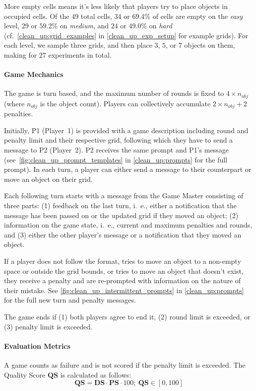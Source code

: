 More empty cells means it's less likely that players try to place objects in occupied cells. Of the 49 total cells, $34$ or $69.4\%$ of cells are empty on the \textit{easy} level, $29$ or $59.2\%$ on \textit{medium}, and $24$ or $49.0\%$ on \textit{hard} (cf.~\cref{clean_up:grid_examples} in \cref{clean_up_exp_setup} for example grids). For each level, we sample three grids, and then place $3$, $5$, or $7$ objects on them, making for $27$ experiments in total.

\paragraph{Game Mechanics} The game is turn based, and the maximum number of rounds is fixed to $4 \times n_{obj}$ (where $n_{obj}$ is the object count). Players can collectively accumulate $2 \times n_{obj} + 2$ penalties.

Initially, P1 (Player~1) is provided with a game description including round and penalty limit and their respective grid, following which they have to send a message to P2 (Player~2). P2 receives the same prompt and P1's message (see~\cref{fig:clean_up_prompt_templates} in \cref{clean_up:prompts} for the full prompt). In each turn, a player can either send a message to their counterpart or move an object on their grid.

Each following turn starts with a message from the Game Master consisting of three parts: (1) feedback on the last turn, i.~e., either a notification that the message has been passed on or the updated grid if they moved an object; (2) information on the game state, i.~e., current and maximum penalties and rounds, and (3) either the other player's message or a notification that they moved an object. 

If a player does not follow the format, tries to move an object to a non-empty space or outside the grid bounds, or tries to move an object that doesn't exist, they receive a penalty and are re-prompted with information on the nature of their mistake. See \cref{fig:clean_up_intermittent_prompts} in \cref{clean_up:prompts} for the full new turn and penalty messages.

The game ends if (1) both players agree to end it, (2) round limit is exceeded, or (3) penalty limit is exceeded.

\paragraph{Evaluation Metrics} A game counts as failure and is not scored if the penalty limit is exceeded. The Quality Score $\mathbf{QS}$ is calculated as follows:
$$\mathbf{QS} = \mathbf{DS} \cdot \mathbf{PS} \cdot 100; \ \mathbf{QS} \in [0, 100]$$

